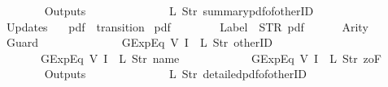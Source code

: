\begin{isabellebody}
\ \ \ \ \ \ {\isacharbrackright}{\isacharcomma}\isanewline
\ \ \ \ \ \ Outputs\ {\isacharequal}\ {\isacharbrackleft}\isanewline
\ \ \ \ \ \ \ \ \ \ \ \ {\isacharparenleft}L\ {\isacharparenleft}Str\ {\isacharprime}{\isacharprime}summary{\isacharunderscore}pdf{\isacharunderscore}of{\isacharunderscore}otherID{\isacharprime}{\isacharprime}{\isacharparenright}{\isacharparenright}\isanewline
\ \ \ \ \ \ {\isacharbrackright}{\isacharcomma}\isanewline
\ \ \ \ \ \ Updates\ {\isacharequal}\ {\isacharbrackleft}{\isacharbrackright}\isanewline
{\isasymrparr}{\isachardoublequoteclose}\isanewline
\isanewline
{}\isamarkupfalse%
\ {\isachardoublequoteopen}pdf{}{\isachardoublequoteclose}\ {\isacharcolon}{\isacharcolon}\ {\isachardoublequoteopen}transition{\isachardoublequoteclose}\ \isanewline
{\isachardoublequoteopen}pdf{}\ {\isasymequiv}\ {\isasymlparr}\isanewline
\ \ \ \ \ \ Label\ {\isacharequal}\ STR\ {\isacharprime}{\isacharprime}pdf{\isacharprime}{\isacharprime}{\isacharcomma}\isanewline
\ \ \ \ \ \ Arity\ {\isacharequal}\ {}{\isacharcomma}\isanewline
\ \ \ \ \ \ Guard\ {\isacharequal}\ {\isacharbrackleft}\isanewline
\ \ \ \ \ \ \ \ \ \ \ \ GExp{\isachardot}Eq\ {\isacharparenleft}V\ {\isacharparenleft}I\ {}{\isacharparenright}{\isacharparenright}\ {\isacharparenleft}L\ {\isacharparenleft}Str\ {\isacharprime}{\isacharprime}otherID{\isacharprime}{\isacharprime}{\isacharparenright}{\isacharparenright}{\isacharcomma}\isanewline
\ \ \ \ \ \ \ \ \ \ \ \ GExp{\isachardot}Eq\ {\isacharparenleft}V\ {\isacharparenleft}I\ {}{\isacharparenright}{\isacharparenright}\ {\isacharparenleft}L\ {\isacharparenleft}Str\ {\isacharprime}{\isacharprime}name{\isacharprime}{\isacharprime}{\isacharparenright}{\isacharparenright}{\isacharcomma}\isanewline
\ \ \ \ \ \ \ \ \ \ \ \ GExp{\isachardot}Eq\ {\isacharparenleft}V\ {\isacharparenleft}I\ {}{\isacharparenright}{\isacharparenright}\ {\isacharparenleft}L\ {\isacharparenleft}Str\ {\isacharprime}{\isacharprime}{}zoF{\isacharprime}{\isacharprime}{\isacharparenright}{\isacharparenright}\isanewline
\ \ \ \ \ \ {\isacharbrackright}{\isacharcomma}\isanewline
\ \ \ \ \ \ Outputs\ {\isacharequal}\ {\isacharbrackleft}\isanewline
\ \ \ \ \ \ \ \ \ \ \ \ {\isacharparenleft}L\ {\isacharparenleft}Str\ {\isacharprime}{\isacharprime}detailed{\isacharunderscore}pdf{\isacharunderscore}of{\isacharunderscore}otherID{\isacharprime}{\isacharprime}{\isacharparenright}{\isacharparenright}\isanewline
\ \ \ \ \ \ {\isacharbrackright}{\isacharcomma}\isanewline

\end{isabellebody}
